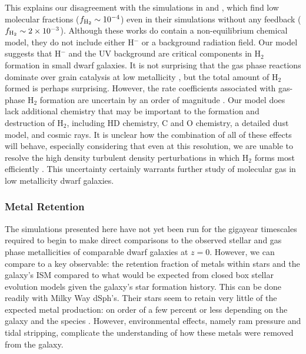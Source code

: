\documentclass[twocolumn]{aastex61}
\begin{document}
This explains our disagreement with the simulations in \citet{Hu2016} and \citet{Hu2017}, which find low molecular fractions ($f_{\rm H_2} \sim 10^{-4}$) even in their simulations without any feedback ($f_{\rm H_2} \sim 2 \times 10^{-3}$). Although these works do contain a non-equilibrium chemical model, they do not include either H$^{-}$ or a background radiation field. Our model suggests that H$^{-}$ and the UV background are critical components in H$_2$ formation in small dwarf galaxies. It is not surprising that the gas phase reactions dominate over grain catalysis at low metallicity \citep{Glover2003}, but the total amount of H$_2$ formed is perhaps surprising. However, the rate coefficients associated with gas-phase H$_2$ formation are uncertain by an order of magnitude \citep{Glover2006,Glover2007}. Our model does lack additional chemistry that may be important to the formation and destruction of H$_2$, including HD chemistry, C and O chemistry, a detailed dust model, and cosmic rays. It is unclear how the combination of all of these effects will behave, especially considering that even at this resolution, we are unable to resolve the high density turbulent density perturbations in which H$_2$ forms most efficiently \citep{Glover2007}. This uncertainty certainly warrants further study of molecular gas in low metallicity dwarf galaxies.

\subsubsection{Metal Retention}
\label{sec:obs_metals}

The simulations presented here have not yet been run for the gigayear timescales required to begin to make direct comparisons to the observed stellar and gas phase metallicities of comparable dwarf galaxies at $z = 0$. However, we can compare to a key observable: the retention fraction of metals within stars and the galaxy's ISM compared to what would be expected from closed box stellar evolution models given the galaxy's star formation history. This can be done readily with Milky Way dSph's. Their stars seem to retain very little of the expected metal production: on order of a few percent or less depending on the galaxy and the species \citep{Kirby2011-metals}. However, environmental effects, namely ram pressure and tidal stripping, complicate the understanding of how these metals were removed from the galaxy. 
\end{document}
